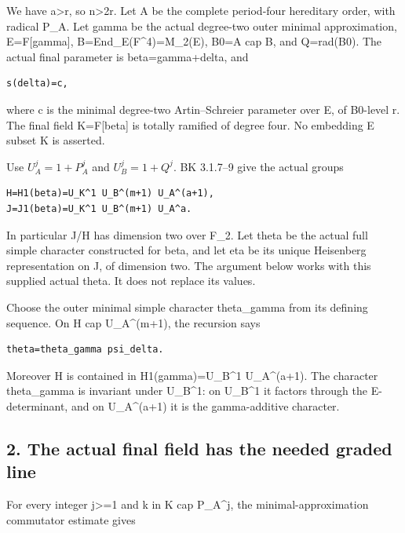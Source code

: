 We have a\textgreater r, so n\textgreater2r. Let A be the complete
period-four hereditary order, with radical P\_A. Let gamma be the actual
degree-two outer minimal approximation, E=F{[}gamma{]},
B=End\_E(F\^{}4)=M\_2(E), B0=A cap B, and Q=rad(B0). The actual final
parameter is beta=gamma+delta, and

\begin{Verbatim}[fontsize=\small,breaklines=true,breakanywhere=true]
s(delta)=c,
\end{Verbatim}

where c is the minimal degree-two Artin--Schreier parameter over E, of
B0-level r. The final field K=F{[}beta{]} is totally ramified of degree four. No embedding E subset K is asserted.

Use \(U_A^j=1+P_A^j\) and \(U_B^j=1+Q^j\).
BK 3.1.7--9 give the actual groups

\begin{Verbatim}[fontsize=\small,breaklines=true,breakanywhere=true]
H=H1(beta)=U_K^1 U_B^(m+1) U_A^(a+1),
J=J1(beta)=U_K^1 U_B^(m+1) U_A^a.
\end{Verbatim}

In particular J/H has dimension two over F\_2. Let theta be the actual
full simple character constructed for beta, and let eta be its unique
Heisenberg representation on J, of dimension two. The argument below
works with this supplied actual theta. It does not replace its values.

Choose the outer minimal simple character theta\_gamma from its defining
sequence. On H cap U\_A\^{}(m+1), the recursion says

\begin{Verbatim}[fontsize=\small,breaklines=true,breakanywhere=true]
theta=theta_gamma psi_delta.
\end{Verbatim}

Moreover H is contained in H1(gamma)=U\_B\^{}1 U\_A\^{}(a+1). The
character theta\_gamma is invariant under U\_B\^{}1: on U\_B\^{}1 it
factors through the E-determinant, and on U\_A\^{}(a+1) it is the
gamma-additive character.

\hypertarget{rank4-the-actual-final-field-has-the-needed-graded-line}{%
\subsection{2. The actual final field has the needed graded
line}\label{rank4-the-actual-final-field-has-the-needed-graded-line}}

For every integer j\textgreater=1 and k in K cap P\_A\^{}j, the
minimal-approximation commutator estimate gives

